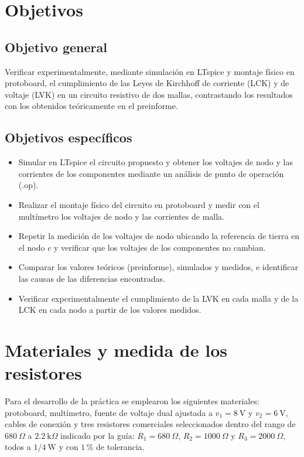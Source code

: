 \documentclass[conference,10pt]{IEEEtran}
\begin{document}
\section{Objetivos}
\subsection{Objetivo general}
Verificar experimentalmente, mediante simulación en LTspice y montaje físico en protoboard, el cumplimiento de las Leyes de Kirchhoff de corriente (LCK) y de voltaje (LVK) en un circuito resistivo de dos mallas, contrastando los resultados con los obtenidos teóricamente en el preinforme.

\subsection{Objetivos específicos}
\begin{itemize}
  \item Simular en LTspice el circuito propuesto y obtener los voltajes de nodo y las corrientes de los componentes mediante un análisis de punto de operación (.op).
  \item Realizar el montaje físico del circuito en protoboard y medir con el multímetro los voltajes de nodo y las corrientes de malla.
  \item Repetir la medición de los voltajes de nodo ubicando la referencia de tierra en el nodo $c$ y verificar que los voltajes de los componentes no cambian.
  \item Comparar los valores teóricos (preinforme), simulados y medidos, e identificar las causas de las diferencias encontradas.
  \item Verificar experimentalmente el cumplimiento de la LVK en cada malla y de la LCK en cada nodo a partir de los valores medidos.
\end{itemize}

\section{Materiales y medida de los resistores}
Para el desarrollo de la práctica se emplearon los siguientes materiales: protoboard, multímetro, fuente de voltaje dual ajustada a $v_1=8~\mathrm{V}$ y $v_2=6~\mathrm{V}$, cables de conexión y tres resistores comerciales seleccionados dentro del rango de $680~\Omega$ a $2.2~\mathrm{k}\Omega$ indicado por la guía: $R_1=680~\Omega$, $R_2=1000~\Omega$ y $R_3=2000~\Omega$, todos a $1/4~\mathrm{W}$ y con $1\,\%$ de tolerancia.
\end{document}
